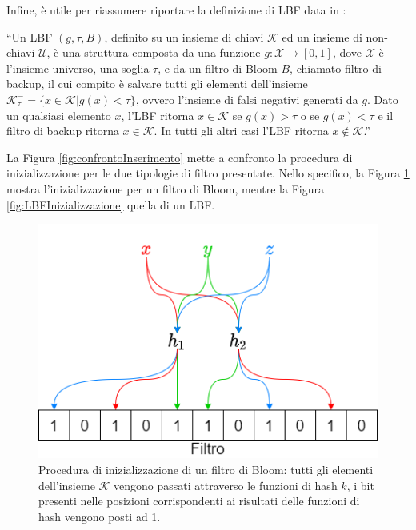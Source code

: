 \documentclass[../../main.tex]{subfiles}
\begin{document}
    Infine, è utile per riassumere riportare la definizione di LBF data in \cite{10.5555/3326943.3326986}: 

    ``Un LBF $(g, \tau, B)$, definito su un insieme di chiavi $\mathcal{K}$ ed un insieme di non-chiavi $\mathcal{U}$, è una struttura composta da una funzione $g : \mathcal{X} \rightarrow [0,1]$, dove $\mathcal{X}$ è l'insieme universo, una soglia $\tau$, e da un filtro di Bloom $B$, chiamato filtro di backup, il cui compito è salvare tutti gli elementi dell'insieme $\mathcal{K}_{\tau}^- = \{x \in \mathcal{K} | g(x) < \tau\}$, ovvero l'insieme di falsi negativi generati da $g$. Dato un qualsiasi elemento $x$, l'LBF ritorna $x \in \mathcal{K}$ se $g(x) > \tau$ o se $g(x) < \tau$ e il filtro di backup ritorna $x \in \mathcal{K}$. In tutti gli altri casi l'LBF ritorna $x\notin \mathcal{K}$.''

    La Figura \ref{fig:confrontoInserimento} mette a confronto la procedura di inizializzazione per le due tipologie di filtro presentate. Nello specifico, la Figura \ref{fig:BFInizializzazione} mostra l'inizializzazione per un filtro di Bloom, mentre la Figura \ref{fig:LBFInizializzazione} quella di un LBF.

    \begin{figure}[H]
        \centering
        \includegraphics[width=\textwidth]{immagini/5_1/BFInizializzazione.png}
        \caption{Procedura di inizializzazione di un filtro di Bloom: tutti gli elementi dell'insieme $\mathcal{K}$ vengono passati attraverso le funzioni di hash $k$, i bit presenti nelle posizioni corrispondenti ai risultati delle funzioni di hash vengono posti ad 1.}
        \label{fig:BFInizializzazione}
    \end{figure}
\end{document}
